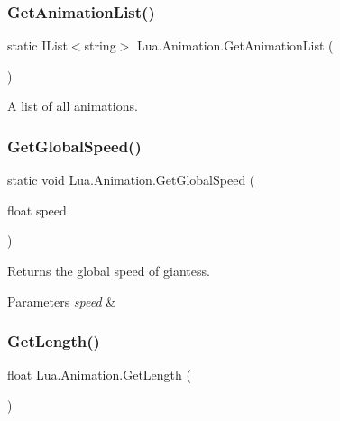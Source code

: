 \subsubsection{\texorpdfstring{GetAnimationList()}{GetAnimationList()}}
{\footnotesize\ttfamily static I\+List$<$string$>$ Lua.\+Animation.\+Get\+Animation\+List (\begin{DoxyParamCaption}{ }\end{DoxyParamCaption})\hspace{0.3cm}{\ttfamily [static]}}



A list of all animations. 

\mbox{\label{class_lua_1_1_animation_ad91c4ef8fcb303877802e1e38fd27b85}} 
\subsubsection{\texorpdfstring{GetGlobalSpeed()}{GetGlobalSpeed()}}
{\footnotesize\ttfamily static void Lua.\+Animation.\+Get\+Global\+Speed (\begin{DoxyParamCaption}\item[{float}]{speed }\end{DoxyParamCaption})\hspace{0.3cm}{\ttfamily [static]}}



Returns the global speed of giantess. 


\begin{DoxyParams}{Parameters}
{\em speed} & \\
\hline
\end{DoxyParams}
\mbox{\label{class_lua_1_1_animation_a8da88aefb747e3128bcbf35be8451b21}} 
\subsubsection{\texorpdfstring{GetLength()}{GetLength()}}
{\footnotesize\ttfamily float Lua.\+Animation.\+Get\+Length (\begin{DoxyParamCaption}{ }\end{DoxyParamCaption})}



